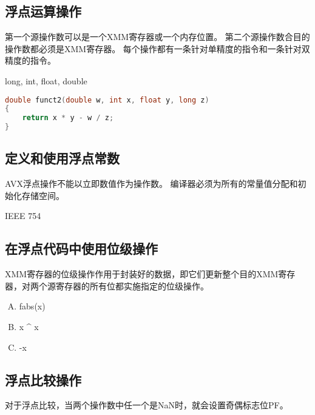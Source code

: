 {    \subsection{浮点运算操作}
    {
        第一个源操作数可以是一个XMM寄存器或一个内存位置。
        第二个源操作数合目的操作数都必须是XMM寄存器。
        每个操作都有一条针对单精度的指令和一条针对双精度的指令。

        \begin{practicec}
            long, int, float, double
        \end{practicec}

        \begin{practicec}
            \begin{lstlisting}[language=C]
double funct2(double w, int x, float y, long z)
{
    return x * y - w / z;
}
            \end{lstlisting}
        \end{practicec}
    }

    \subsection{定义和使用浮点常数}
    {
        AVX浮点操作不能以立即数值作为操作数。
        编译器必须为所有的常量值分配和初始化存储空间。

        \begin{practicec}
            IEEE 754
        \end{practicec}
    }

    \subsection{在浮点代码中使用位级操作}
    {
        XMM寄存器的位级操作作用于封装好的数据，即它们更新整个目的XMM寄存器，对两个源寄存器的所有位都实施指定的位级操作。

        \begin{practicec}
            \begin{enumerate}[A.]
                \item fabs(x)
                \item x ^ x
                \item -x
            \end{enumerate}
        \end{practicec}
    }

    \subsection{浮点比较操作}
    {
        对于浮点比较，当两个操作数中任一个是NaN时，就会设置奇偶标志位PF。
    }
}
